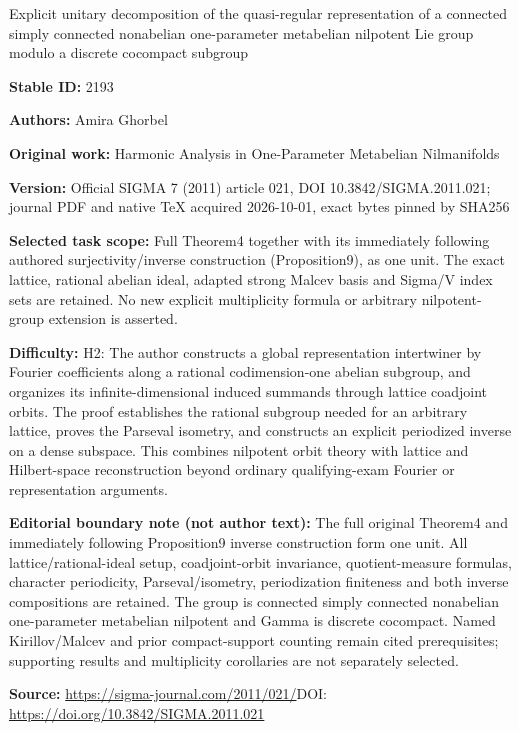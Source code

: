 \documentclass[11pt]{article}
\begin{document}
\begin{center}\Large Explicit unitary decomposition of the quasi-regular representation of a connected simply connected nonabelian one-parameter metabelian nilpotent Lie group modulo a discrete cocompact subgroup\end{center}
\noindent\textbf{Stable ID:} 2193\par
\noindent\textbf{Authors:} Amira Ghorbel\par
\noindent\textbf{Original work:} Harmonic Analysis in One-Parameter Metabelian Nilmanifolds\par
\noindent\textbf{Version:} Official SIGMA 7 (2011) article 021, DOI 10.3842/SIGMA.2011.021; journal PDF and native TeX acquired 2026-10-01, exact bytes pinned by SHA256\par
\noindent\textbf{Selected task scope:} Full Theorem4 together with its immediately following authored surjectivity/inverse construction (Proposition9), as one unit. The exact lattice, rational abelian ideal, adapted strong Malcev basis and Sigma/V index sets are retained. No new explicit multiplicity formula or arbitrary nilpotent-group extension is asserted.\par
\noindent\textbf{Difficulty:} H2: The author constructs a global representation intertwiner by Fourier coefficients along a rational codimension-one abelian subgroup, and organizes its infinite-dimensional induced summands through lattice coadjoint orbits. The proof establishes the rational subgroup needed for an arbitrary lattice, proves the Parseval isometry, and constructs an explicit periodized inverse on a dense subspace. This combines nilpotent orbit theory with lattice and Hilbert-space reconstruction beyond ordinary qualifying-exam Fourier or representation arguments.\par
\noindent\textbf{Editorial boundary note (not author text):} The full original Theorem4 and immediately following Proposition9 inverse construction form one unit. All lattice/rational-ideal setup, coadjoint-orbit invariance, quotient-measure formulas, character periodicity, Parseval/isometry, periodization finiteness and both inverse compositions are retained. The group is connected simply connected nonabelian one-parameter metabelian nilpotent and Gamma is discrete cocompact. Named Kirillov/Malcev and prior compact-support counting remain cited prerequisites; supporting results and multiplicity corollaries are not separately selected.\par
\noindent\textbf{Source:} \url{https://sigma-journal.com/2011/021/}\quad DOI: \url{https://doi.org/10.3842/SIGMA.2011.021}\par
\end{document}
